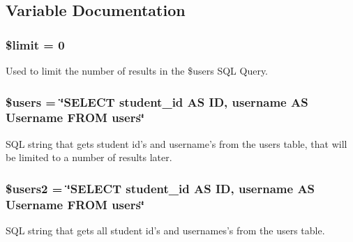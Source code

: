 \subsection{\-Variable \-Documentation}
\hypertarget{rmUser_8php_ae05862a0294251c88629b141b5ce329a}{
\subsubsection[{\$limit}]{\setlength{\rightskip}{0pt plus 5cm}\$limit = 0}}\label{rmUser_8php_ae05862a0294251c88629b141b5ce329a}
\-Used to limit the number of results in the \$users \-S\-Q\-L \-Query. \hypertarget{rmUser_8php_a28005d22fa7ef2dfe215ad886b497d9c}{
\subsubsection[{\$users}]{\setlength{\rightskip}{0pt plus 5cm}\$users = \char`\"{}\-S\-E\-L\-E\-C\-T student\-\_\-id \-A\-S \-I\-D, username \-A\-S \-Username \-F\-R\-O\-M users\char`\"{}}}\label{rmUser_8php_a28005d22fa7ef2dfe215ad886b497d9c}
\-S\-Q\-L string that gets student id's and username's from the users table, that will be limited to a number of results later. \hypertarget{rmUser_8php_a62dd122dbddde32a07c3f104eabb051f}{
\subsubsection[{\$users2}]{\setlength{\rightskip}{0pt plus 5cm}\$users2 = \char`\"{}\-S\-E\-L\-E\-C\-T student\-\_\-id \-A\-S \-I\-D, username \-A\-S \-Username \-F\-R\-O\-M users\char`\"{}}}\label{rmUser_8php_a62dd122dbddde32a07c3f104eabb051f}
\-S\-Q\-L string that gets all student id's and usernames's from the users table. 